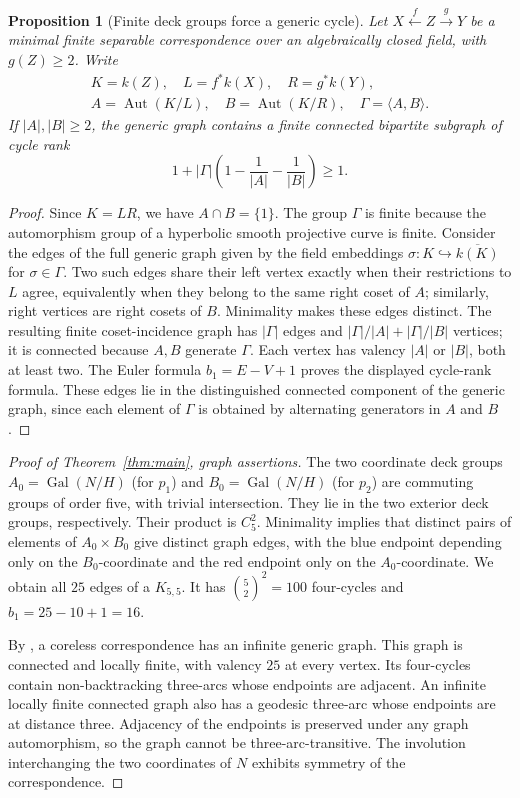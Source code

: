 \documentclass[11pt,a4paper,reqno]{amsart}
\newtheorem{proposition}[theorem]{Proposition}
\newcommand{\Aut}{\operatorname{Aut}}
\newcommand{\Gal}{\operatorname{Gal}}
\begin{document}
\begin{proposition}[Finite deck groups force a generic cycle]
\label{prop:cycle}
Let $X\xleftarrow{f}Z\xrightarrow{g}Y$ be a minimal finite
separable correspondence over an algebraically closed field, with
$g(Z)\ge2$. Write
\[
\begin{gathered}
 K=k(Z),\quad L=f^*k(X),\quad R=g^*k(Y),\\
 A=\Aut(K/L),\quad B=\Aut(K/R),\quad \Gamma=\langle A,B\rangle.
\end{gathered}
\]
If $|A|,|B|\ge2$, the generic graph contains a finite connected
bipartite subgraph of cycle rank
\begin{equation}\label{eq:cycle-rank}
    1+|\Gamma|\left(1-\frac1{|A|}-\frac1{|B|}\right)\ge1.
\end{equation}
\end{proposition}
\begin{proof}
Since $K=LR$, we have $A\cap B=\{1\}$. The group
$\Gamma$ is finite because the automorphism group of a hyperbolic
smooth projective curve is finite.
Consider the edges of the full generic graph given by the field
embeddings $\sigma:K\hookrightarrow\overline{k(K)}$ for
$\sigma\in\Gamma$. Two such edges share their left vertex exactly
when their restrictions to $L$ agree, equivalently when they belong to
the same right coset of $A$; similarly, right vertices are right
cosets of $B$.  Minimality makes these edges distinct.
The resulting finite coset-incidence graph has $|\Gamma|$ edges and
$|\Gamma|/|A|+|\Gamma|/|B|$ vertices; it is connected because $A,B$
generate $\Gamma$. Each vertex has valency $|A|$ or $|B|$, both at
least two. The Euler formula $b_1=E-V+1$ proves the displayed
cycle-rank formula. These edges lie in the distinguished connected
component of the generic graph, since each element of $\Gamma$ is
obtained by alternating generators in $A$ and $B$.
\end{proof}

\begin{proof}[Proof of Theorem~\ref{thm:main}, graph assertions]
The two coordinate deck groups $A_0=\Gal(N/H)$ (for $p_1$) and
$B_0=\Gal(N/H)$ (for $p_2$) are commuting groups of order five,
with trivial intersection. They lie in the two exterior deck groups,
respectively. Their product is $C_5^2$.
Minimality implies that distinct pairs of elements of $A_0\times
B_0$ give distinct graph edges, with the blue endpoint depending only
on the $B_0$-coordinate and the red endpoint only on the
$A_0$-coordinate. We obtain all $25$ edges of a $K_{5,5}$.
It has $\binom52^2=100$ four-cycles and
$b_1=25-10+1=16$.

By \cite[Proposition 5.10]{Kri18}, a coreless correspondence has an
infinite generic graph. This graph is connected and locally finite,
with valency $25$ at every vertex. Its four-cycles contain
non-backtracking three-arcs whose endpoints are adjacent.
An infinite locally finite connected graph also has a geodesic
three-arc whose endpoints are at distance three. Adjacency of the
endpoints is preserved under any graph automorphism, so the graph
cannot be three-arc-transitive. The involution interchanging the two
coordinates of $N$ exhibits symmetry of the correspondence.
\end{proof}
\end{document}
